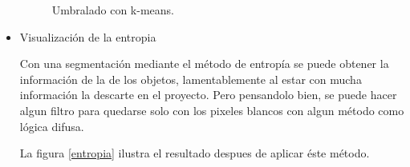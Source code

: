 \documentclass[a4paper, 11pt]{article}
\begin{document}
\begin{itemize}
  \begin{figure}[ht]%
    \centering
    \qquad
    \caption{Umbralado con k-means.}%
    \label{kmeans}%
\end{figure}
  
\item Visualización de la entropia

  Con una segmentación mediante el método de entropía se puede obtener la información de la de los objetos, lamentablemente al estar con mucha información la descarte en el proyecto. Pero pensandolo bien, se puede hacer algun filtro para quedarse solo con los pixeles blancos con algun método como lógica difusa.
  
  La figura \ref{entropia} ilustra el resultado despues de aplicar éste método.
  

\end{itemize}
\end{document}
